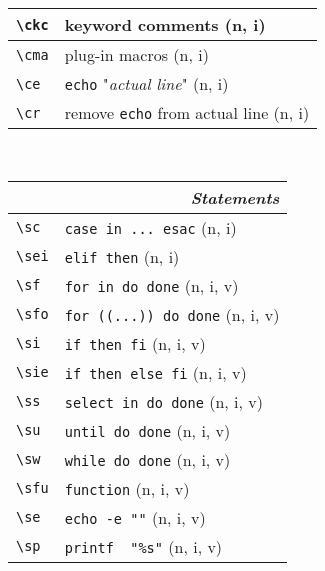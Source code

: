 \documentclass[oneside,10pt,landscape,DIV17]{scrartcl}
\begin{document}
\begin{multicols}{3}
\begin{center}
\begin{tabular}[]{|p{11mm}|p{60mm}|}
\hline     \verb'\ckc'  & keyword comments                  \hfill (n, i)\\
\hline     \verb'\cma'  & plug-in macros                    \hfill (n, i)\\
%
\hline     \verb'\ce'   & \texttt{echo} "\textsl{actual line}"  \hfill (n, i)\\
\hline     \verb'\cr'   & remove \texttt{echo} from actual line \hfill (n, i)\\
\hline
\end{tabular}\\
%
%
\begin{tabular}[]{|p{11mm}|p{60mm}|}
\hline
\multicolumn{2}{|r|}{\textsl{\textbf{S}tatements}}                    \\[1.0ex]
\hline \verb'\sc'  & \verb'case in ... esac'               \hfill (n, i)\\
\hline \verb'\sei' & \verb'elif then'                      \hfill (n, i)\\
\hline \verb'\sf'  & \verb'for in do done'                 \hfill (n, i, v)\\
\hline \verb'\sfo' & \verb'for ((...)) do done'            \hfill (n, i, v)\\
\hline \verb'\si'  & \verb'if then fi'                     \hfill (n, i, v)\\
\hline \verb'\sie' & \verb'if then else fi'                \hfill (n, i, v)\\
\hline \verb'\ss'  & \verb'select in do done'              \hfill (n, i, v)\\
\hline \verb'\su'  & \verb'until do done'                  \hfill (n, i, v)\\
\hline \verb'\sw'  & \verb'while do done'                  \hfill (n, i, v)\\
\hline \verb'\sfu' & \verb'function'                       \hfill (n, i, v)\\
%
\hline \verb'\se'  & \verb'echo -e ""'                     \hfill (n, i, v)\\
\hline \verb'\sp'  & \verb'printf  "%s"'                   \hfill (n, i, v)\\

\end{tabular}
\end{center}
\end{multicols}
\end{document}
